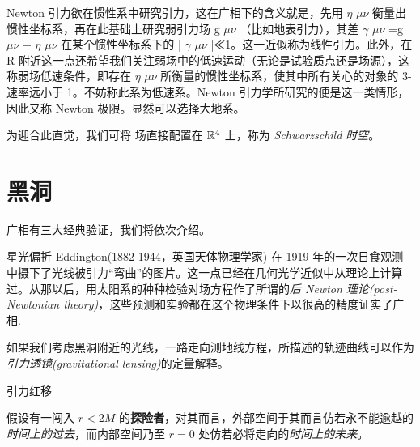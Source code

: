 Newton 引力欲在惯性系中研究引力，这在广相下的含义就是，先用 
 $\eta$  $\mu\nu$ 
 衡量出惯性坐标系，再在此基础上研究弱引力场 
g $\mu\nu$ 
（比如地表引力），其差 
 $\gamma$  $\mu\nu$ =g $\mu\nu$ − $\eta$  $\mu\nu$ 
 在某个惯性坐标系下的 
| $\gamma$  $\mu\nu$ |≪1。这一近似称为线性引力。此外，在 R
 附近这一点还希望我们关注弱场中的低速运动（无论是试验质点还是场源），这称弱场低速条件，即存在  $\eta$  $\mu\nu$ 
 所衡量的惯性坐标系，使其中所有关心的对象的 3-速率远小于 1。不妨称此系为低速系。Newton 引力学所研究的便是这一类情形，因此又称 Newton 极限。显然可以选择大地系。







为迎合此直觉，我们可将 场直接配置在 $\mathbb{R}^4$ 上，称为 \textit{Schwarzschild 时空}。



\section{黑洞}

广相有三大经典验证，我们将依次介绍。

星光偏折
Eddington(1882-1944，英国天体物理学家) 在 1919 年的一次日食观测中摄下了光线被引力“弯曲”的图片。这一点已经在几何光学近似中从理论上计算过。从那以后，用太阳系的种种检验对场方程作了所谓的\textit{后 Newton 理论(post-Newtonian theory)}，这些预测和实验都在这个物理条件下以很高的精度证实了广相.

如果我们考虑黑洞附近的光线，一路走向测地线方程，所描述的轨迹曲线可以作为\textit{引力透镜(gravitational lensing)}的定量解释。

引力红移


假设有一闯入 $r<2M$ 的\textbf{探险者}，对其而言，外部空间于其而言仿若永不能逾越的\textit{时间上的过去}，而内部空间乃至 $r=0$ 处仿若必将走向的\textit{时间上的未来}。



